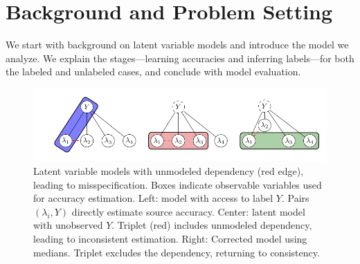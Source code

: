 \section{Background and Problem Setting} \label{sec:background}
\vspace{-.5em}
We start with background on latent variable models and introduce the model we analyze. We explain the stages---learning accuracies and inferring labels---for both the labeled and unlabeled cases, and conclude with model evaluation.

\begin{figure}[t]
    \centering
    \hspace*{-.5cm}\includegraphics[width=.7\textwidth]{figures/models.pdf}
    \caption{Latent variable models with unmodeled dependency (red edge), leading to misspecification. Boxes indicate observable variables used for accuracy estimation. Left: model with access to label $Y$. Pairs $(\lambda_i, Y)$ directly estimate source accuracy. Center: latent model with unobserved $Y$. Triplet (red) includes unmodeled dependency, leading to inconsistent estimation. Right: Corrected model using medians. Triplet excludes the dependency, returning to consistency.}
    \label{fig:biases}
\end{figure}



